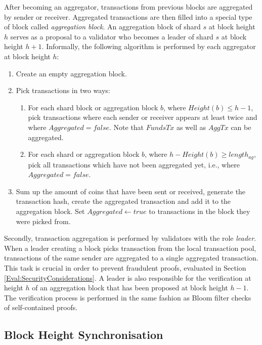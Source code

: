 After becoming an aggregator, transactions from previous blocks are aggregated by sender or receiver. Aggregated transactions are then filled into a special type of block called \textit{aggregation block}. An aggregation block of shard $s$ at block height $h$ serves as a proposal to a validator who becomes a leader of shard $s$ at block height $h + 1$. Informally, the following algorithm is performed by each aggregator at block height $h$:
\begin{enumerate}
  \item Create an empty aggregation block.
  \item Pick transactions in two ways:
    \begin{enumerate}
      \item For each shard block or aggregation block $b$, where $Height(b) \leq h - 1$, pick  transactions where each sender or receiver appears at least twice and where $Aggregated = false$. Note that $FundsTx$ as well as $AggTx$ can be aggregated.
      \item For each shard or aggregation block $b$, where $h - Height(b) \geq length_{ag}$, pick all transactions which have not been aggregated yet, i.e., where $Aggregated = false$.
    \end{enumerate}
  \item Sum up the amount of coins that have been sent or received, generate the transaction hash, create the aggregated transaction and add it to the aggregation block. Set $Aggregated \leftarrow true$ to transactions in the block they were picked from.
\end{enumerate}

Secondly, transaction aggregation is performed by validators with the role \textit{leader}. When a leader creating a block picks transaction from the local transaction pool, transactions of the same sender are aggregated to a single aggregated transaction. This task is crucial in order to prevent fraudulent proofs, evaluated in Section \ref{Eval:SecurityConsiderations}. A leader is also responsible for the verification at height $h$ of an aggregation block that has been proposed at block height $h - 1$. The verification process is performed in the same fashion as Bloom filter checks of self-contained proofs.

\subsection{Block Height Synchronisation}
\label{Design:BlockHeightSync}

